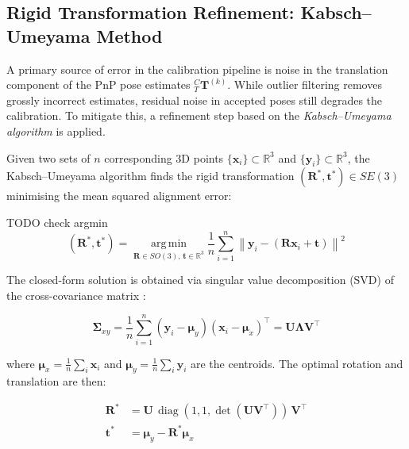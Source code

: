 \subsection{Rigid Transformation Refinement: Kabsch--Umeyama Method}
\label{subsec:kabsch}

A primary source of error in the calibration pipeline is noise in the
translation component of the PnP pose estimates ${}^C_T\mathbf{T}^{(k)}$.
While outlier filtering removes
grossly incorrect estimates, residual noise in accepted poses still degrades
the calibration. To mitigate this, a refinement step based on the
\textit{Kabsch--Umeyama algorithm} \cite{umeyama1991least} is applied.

Given two sets of $n$ corresponding 3D points $\{\mathbf{x}_i\} \subset
\mathbb{R}^3$ and $\{\mathbf{y}_i\} \subset \mathbb{R}^3$, the
Kabsch--Umeyama algorithm finds the rigid transformation
$(\mathbf{R}^*, \mathbf{t}^*) \in SE(3)$ minimising the mean squared
alignment error:


TODO check argmin
\begin{equation}
    (\mathbf{R}^*, \mathbf{t}^*) =
    \operatorname*{arg\,min}_{\mathbf{R} \in SO(3),\, \mathbf{t} \in \mathbb{R}^3}
    \frac{1}{n} \sum_{i=1}^{n}
    \left\lVert \mathbf{y}_i -
    \left(\mathbf{R}\mathbf{x}_i + \mathbf{t}\right) \right\rVert^2
    \label{eq:kabsch_obj}
\end{equation}

\noindent The closed-form solution is obtained via singular value decomposition
(SVD) of the cross-covariance matrix \cite{umeyama1991least}:

\begin{equation}
    \boldsymbol{\Sigma}_{xy} =
    \frac{1}{n} \sum_{i=1}^{n}
    (\mathbf{y}_i - \boldsymbol{\mu}_y)
    (\mathbf{x}_i - \boldsymbol{\mu}_x)^{\top}
    = \mathbf{U} \mathbf{\Lambda} \mathbf{V}^{\top}
    \label{eq:kabsch_svd}
\end{equation}

\noindent where $\boldsymbol{\mu}_x = \frac{1}{n}\sum_i \mathbf{x}_i$ and
$\boldsymbol{\mu}_y = \frac{1}{n}\sum_i \mathbf{y}_i$ are the centroids.
The optimal rotation and translation are then:

\begin{align}
    \mathbf{R}^* &= \mathbf{U}\,
        \operatorname{diag}(1, 1, \det(\mathbf{U}\mathbf{V}^{\top}))\,
        \mathbf{V}^{\top}
    \label{eq:kabsch_R} \\
    \mathbf{t}^* &= \boldsymbol{\mu}_y - \mathbf{R}^* \boldsymbol{\mu}_x
    \label{eq:kabsch_t}
\end{align}


